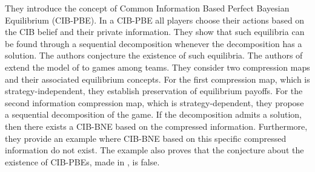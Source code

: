 \documentclass[pdflatex,sn-basic]{sn-jnl}
\theoremstyle{thmstyleone}%
\theoremstyle{thmstyletwo}%
\theoremstyle{thmstylethree}%
\begin{document}
{They introduce the concept of Common Information Based Perfect Bayesian Equilibrium (CIB-PBE). In a CIB-PBE all players choose their actions based on the CIB belief and their private information.} They show that such equilibria can be found through a sequential decomposition whenever the decomposition has a solution. The authors conjecture the existence of such equilibria. 
{The authors of \cite{tang2022dynamic} extend the model of \cite{ouyang2016dynamic} to games among teams. They} consider two compression maps and their associated equilibrium concepts. 
For the first compression map, which is strategy-independent, they establish {preservation of equilibrium payoffs}. For the second information compression map, which is strategy-dependent, 
{they propose a sequential decomposition of the game. If the decomposition admits a solution, then there exists a CIB-BNE based on the compressed information. Furthermore, they provide an example where CIB-BNE based on this specific compressed information do not exist. The example also proves that the conjecture about the existence of CIB-PBEs, made in \cite{ouyang2016dynamic}, is false.}
\end{document}
